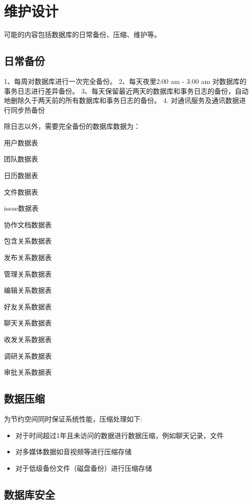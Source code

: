 \chapter{\color{red} 维护设计}
可能的内容包括数据库的日常备份、压缩、维护等。
\section{\color{red} 日常备份}
1、每周对数据库进行一次完全备份。
2、每天夜里2:00 am - 3:00 am 对数据库的事务日志进行差异备份。
3、每天保留最近两天的数据库和事务日志的备份，自动地删除久于两天前的所有数据库和事务日志的备份。
4. 对通讯服务及通讯数据进行同步热备份

除日志以外，需要完全备份的数据库数据为：
{\color{red}
\begin{itemize}
    \item 用户数据表
    \item 团队数据表
    \item 日历数据表
    \item 文件数据表
    \item issue数据表
    \item 协作文档数据表
    \item 包含关系数据表
    \item 发布关系数据表
    \item 管理关系数据表
    \item 编辑关系数据表
    \item 好友关系数据表
    \item 聊天关系数据表
    \item 收发关系数据表
    {\color{red}
    \item 调研关系数据表
    \item 审批关系数据表
    }
    
    
\end{itemize}
}
\section{数据压缩}

为节约空间同时保证系统性能，压缩处理如下:
\begin{itemize}
    \item 对于时间超过1年且未访问的数据进行数据压缩，例如聊天记录，文件
    \item 对多媒体数据如音视频等进行压缩存储
    \item 对于低级备份文件（磁盘备份）进行压缩存储
\end{itemize}


\section{数据库安全}

